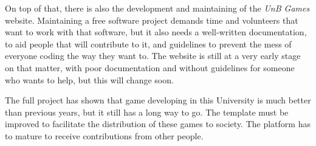 On top of that, there is also the development and maintaining of the \textit{UnB Games} website. Maintaining a free software project demands time and volunteers that want to work with that software, but it also needs a well-written documentation, to aid people that will contribute to it, and guidelines to prevent the mess of everyone coding the way they want to. The website is still at a very early stage on that matter, with poor documentation and without guidelines for someone who wants to help, but this will change soon.

The full project has shown that game developing in this University is much better than previous years, but it still has a long way to go. The template must be improved to facilitate the distribution of these games to society. The platform has to mature to receive contributions from other people.
